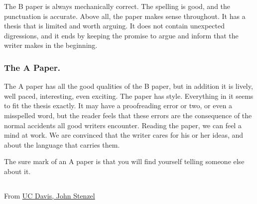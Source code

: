 \documentclass{article}
\begin{document}
The B paper is always mechanically correct. The spelling is good, and the punctuation is accurate. Above all, the paper makes sense throughout. It has a thesis that is limited and worth arguing. It does not contain unexpected digressions, and it ends by keeping the promise to argue and inform that the writer makes in the beginning.

\subsubsection{The A Paper.}
The A paper has all the good qualities of the B paper, but in addition it is lively, well paced, interesting, even exciting. The paper has style. Everything in it seems to fit the thesis exactly. It may have a proofreading error or two, or even a misspelled word, but the reader feels that these errors are the consequence of the normal accidents all good writers encounter. Reading the paper, we can feel a mind at work. We are convinced that the writer cares for his or her ideas, and about the language that carries them.

The sure mark of an A paper is that you will find yourself telling someone else
about it.

\subsection{}
From \href{http://stenzel.ucdavis.edu/standard.htm}{UC Davis, John Stenzel}
\end{document}
